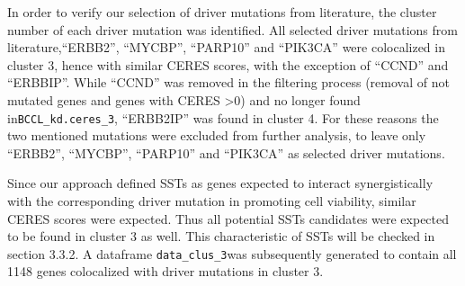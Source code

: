 \documentclass[]{article}
\newenvironment{Shaded}{\begin{snugshade}}{\end{snugshade}}
\newcommand{\CommentTok}[1]{\textcolor[rgb]{0.56,0.35,0.01}{\textit{#1}}}
\newcommand{\ControlFlowTok}[1]{\textcolor[rgb]{0.13,0.29,0.53}{\textbf{#1}}}
\newcommand{\DecValTok}[1]{\textcolor[rgb]{0.00,0.00,0.81}{#1}}
\newcommand{\KeywordTok}[1]{\textcolor[rgb]{0.13,0.29,0.53}{\textbf{#1}}}
\newcommand{\NormalTok}[1]{#1}
\newcommand{\OperatorTok}[1]{\textcolor[rgb]{0.81,0.36,0.00}{\textbf{#1}}}
\newcommand{\StringTok}[1]{\textcolor[rgb]{0.31,0.60,0.02}{#1}}
\begin{document}
In order to verify our selection of driver mutations from literature,
the cluster number of each driver mutation was identified. All selected
driver mutations from literature,``ERBB2'', ``MYCBP'', ``PARP10'' and
``PIK3CA'' were colocalized in cluster 3, hence with similar CERES
scores, with the exception of ``CCND'' and ``ERBBIP''. While ``CCND''
was removed in the filtering process (removal of not mutated genes and
genes with CERES \textgreater0) and no longer found
in\texttt{BCCL\_kd.ceres\_3}, ``ERBB2IP'' was found in cluster 4. For
these reasons the two mentioned mutations were excluded from further
analysis, to leave only ``ERBB2'', ``MYCBP'', ``PARP10'' and ``PIK3CA''
as selected driver mutations.

\begin{Shaded}
\end{Shaded}

Since our approach defined SSTs as genes expected to interact
synergistically with the corresponding driver mutation in promoting cell
viability, similar CERES scores were expected. Thus all potential SSTs
candidates were expected to be found in cluster 3 as well. This
characteristic of SSTs will be checked in section 3.3.2. A dataframe
\texttt{data\_clus\_3}was subsequently generated to contain all 1148
genes colocalized with driver mutations in cluster 3.

\begin{Shaded}
\end{Shaded}
\end{document}
